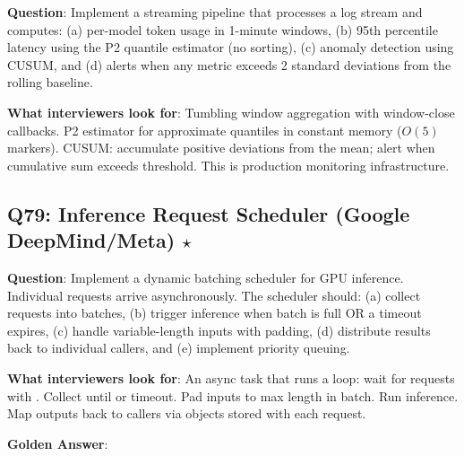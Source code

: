 \textbf{Question}: Implement a streaming pipeline that processes a log stream and computes: (a) per-model token usage in 1-minute windows, (b) 95th percentile latency using the P2 quantile estimator (no sorting), (c) anomaly detection using CUSUM, and (d) alerts when any metric exceeds 2 standard deviations from the rolling baseline.

\textbf{What interviewers look for}: Tumbling window aggregation with window-close callbacks. P2 estimator for approximate quantiles in constant memory ($O(5)$ markers). CUSUM: accumulate positive deviations from the mean; alert when cumulative sum exceeds threshold. This is production monitoring infrastructure.

\subsection{Q79: Inference Request Scheduler (Google DeepMind/Meta) $\star$}

\textbf{Question}: Implement a dynamic batching scheduler for GPU inference. Individual requests arrive asynchronously. The scheduler should: (a) collect requests into batches, (b) trigger inference when batch is full OR a timeout expires, (c) handle variable-length inputs with padding, (d) distribute results back to individual callers, and (e) implement priority queuing.

\textbf{What interviewers look for}: An async task that runs a loop: wait for requests with . Collect until  or timeout. Pad inputs to max length in batch. Run inference. Map outputs back to callers via  objects stored with each request.

\textbf{Golden Answer}:

